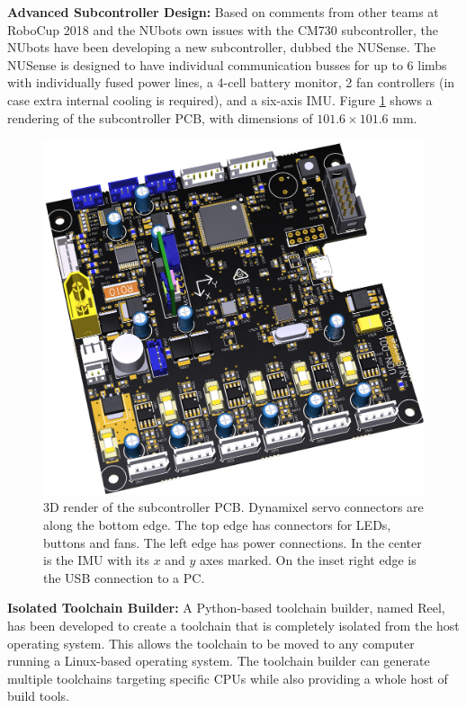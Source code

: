 \documentclass{llncs}
\begin{document}
\noindent\textbf{Advanced Subcontroller Design:} 
Based on comments from other teams at RoboCup 2018 and the NUbots own issues with the CM730 subcontroller, the NUbots have been developing a new subcontroller, dubbed the NUSense. The NUSense is designed to have individual communication busses for up to 6 limbs with individually fused power lines, a 4-cell battery monitor, 2 fan controllers (in case extra internal cooling is required), and a six-axis IMU. Figure \ref{fig:nusense} shows a rendering of the subcontroller PCB, with dimensions of $101.6\times 101.6\textrm{ mm}$. \\

\begin{figure}[h!]
    \centering
    \includegraphics[width=0.80\linewidth]{NUsense3D.png}
    \caption{3D render of the subcontroller PCB. Dynamixel servo connectors are along the bottom edge. The top edge has connectors for LEDs, buttons and fans. The left edge has power connections. In the center is the IMU with its $x$ and $y$ axes marked. On the inset right edge is the USB connection to a PC.}
    \label{fig:nusense}
\end{figure}


\noindent\textbf{Isolated Toolchain Builder:}
A Python-based toolchain builder, named Reel, has been developed to create a toolchain that is completely isolated from the host operating system. This allows the toolchain to be moved to any computer running a Linux-based operating system. The toolchain builder can generate multiple toolchains targeting specific CPUs while also providing a whole host of build tools. \\
\end{document}
